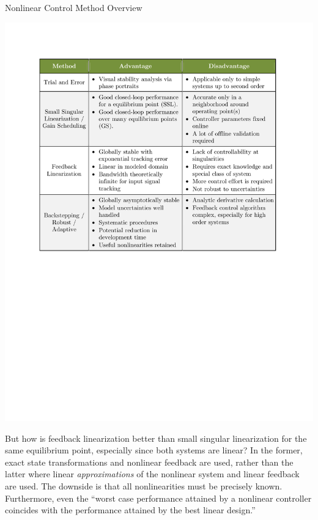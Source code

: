 \documentclass[12pt]{ucthesis}
\begin{document}
	\begin{table}[H]
			\centering
			\caption{Nonlinear Control Method Overview}%
			\vspace{2pt}
			\includegraphics[scale=0.95]{tables/really_stupid_table.pdf}
		\label{tab: nonlinear_methods}%
	\end{table}

But how is feedback linearization better than small singular linearization for the same equilibrium point, especially since both systems are linear? In the former, exact state transformations and nonlinear feedback are used, rather than the latter where linear \textit{approximations} of the nonlinear system and linear feedback are used. The downside is that all nonlinearities must be precisely known.  Furthermore, even the ``worst case performance attained by a nonlinear controller coincides with the performance attained by the best linear design.'' \citet[Linear Versus Nonlinear]{Kokotovic1992}
\end{document}
